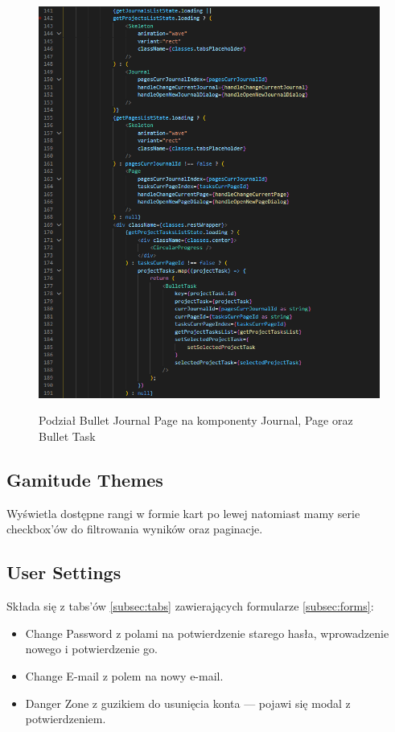 \documentclass[a4paper,11pt]{report}
\begin{document}
\begin{figure}[H]
	\centering
	\includegraphics[scale=0.7]{implementacja/frontend/bullet_journal_division}\\
	\caption{Podział Bullet Journal Page na komponenty Journal, Page oraz Bullet Task}
	\label{fig:bullet_division}
\end{figure}

\subsection{Gamitude Themes}
Wyświetla dostępne rangi w formie kart po lewej natomiast mamy serie checkbox'ów do filtrowania wyników oraz paginacje.

\subsection{User Settings}
Składa się z tabs'ów \ref{subsec:tabs} zawierających formularze \ref{subsec:forms}:
\begin{itemize}
	\item Change Password z polami na potwierdzenie starego hasła, wprowadzenie nowego i potwierdzenie go.
	\item Change E-mail z polem na nowy e-mail.
	\item Danger Zone z guzikiem do usunięcia konta — pojawi się modal z potwierdzeniem.
\end{itemize}
\end{document}
